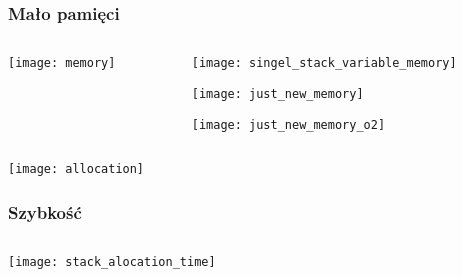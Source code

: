 \documentclass{beamer}
\begin{document}
\begin{frame}[t]
    \frametitle{Mało pamięci}
    \begin{columns}[t]
        \begin{column}{0.5\textwidth}
            \begin{center}
                \texttt{[image: memory]}\\
                \tiny \cite{memory} 
            \end{center}
        \end{column}
        \begin{column}[t]{0.5\textwidth}
            \begin{center}
                \texttt{[image: singel\_stack\_variable\_memory]}

                \vspace{5 mm}

                \texttt{[image: just\_new\_memory]}

                \vspace{5 mm}

                \texttt{[image: just\_new\_memory\_o2]}
            \end{center}
        \end{column}
    \end{columns}
    \begin{center}
        \texttt{[image: allocation]}
        \tiny \cite{allocation} 
    \end{center}
\end{frame}
\begin{frame}[t]
    \frametitle{Szybkość}
    \begin{columns}[t]
        \begin{column}[t]{0.5\textwidth}
            \begin{center}
                \texttt{[image: stack\_alocation\_time]}
            \end{center}
        \end{column}
        \begin{column}[t]{0.5\textwidth}
        \end{column}
    \end{columns}
\end{frame}
\end{document}
